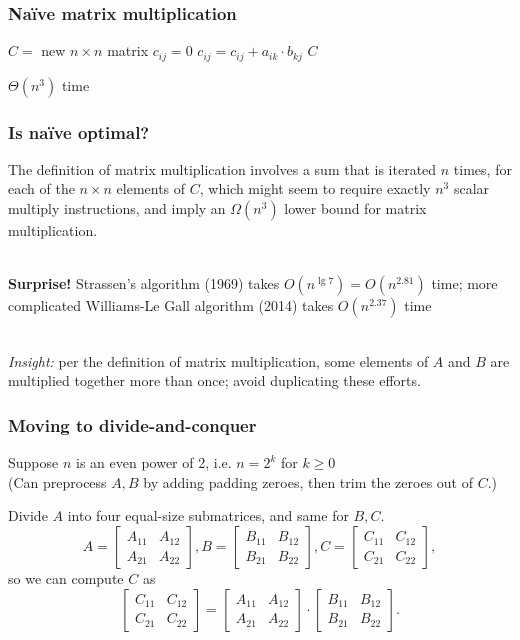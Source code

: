 \documentclass[10pt,aspectratio=169]{beamer}
\newcommand{\stanza}{ \\~\ }
\begin{document}
\begin{frame} \frametitle{Na\"ive matrix multiplication}
  {
  \begin{algorithmic}[1]
    \State $C = $ new $n \times n$ matrix
        \State $c_{ij} = 0$
          \State $c_{ij} = c_{ij} + a_{ik} \cdot b_{kj}$
        \EndFor
      \EndFor
    \EndFor
    \State \Return $C$
    \EndFunction
  \end{algorithmic}
  }
  $\Theta(n^3)$ time
\end{frame}

\begin{frame} \frametitle{Is na\"ive optimal?}
The definition of matrix multiplication involves a sum that is iterated $n$
times, for each of the $n \times n$ elements of $C$, which might seem to
require exactly $n^3$ scalar multiply instructions, and imply an
$\Omega(n^3)$ lower bound for matrix multiplication. \stanza

\textbf{Surprise!} Strassen's algorithm (1969) takes $O(n^{\lg 7})=O(n^{2.81})$ time;
 more complicated Williams-Le Gall algorithm (2014) takes $O(n^{2.37})$ time \stanza

\emph{Insight:} per the definition of matrix multiplication, some elements of
$A$ and $B$ are multiplied together more than once; avoid duplicating these
efforts.
\end{frame}

\begin{frame} \frametitle{Moving to divide-and-conquer}
  Suppose $n$ is an even power of 2, i.e. $n=2^k$ for $k \geq 0$ \\
  (Can preprocess $A, B$ by adding padding zeroes, then trim the zeroes
   out of $C.$)

  Divide $A$ into four equal-size submatrices, and same for $B, C$.
  \[ A = \begin{bmatrix} A_{11} & A_{12} \\ A_{21} & A_{22} \end{bmatrix},
     B = \begin{bmatrix} B_{11} & B_{12} \\ B_{21} & B_{22} \end{bmatrix},
     C = \begin{bmatrix} C_{11} & C_{12} \\ C_{21} & C_{22} \end{bmatrix},
   \]
  so we can compute $C$ as
  \[ \begin{bmatrix} C_{11} & C_{12} \\ C_{21} & C_{22} \end{bmatrix}
     =
     \begin{bmatrix} A_{11} & A_{12} \\ A_{21} & A_{22} \end{bmatrix}
     \cdot
     \begin{bmatrix} B_{11} & B_{12} \\ B_{21} & B_{22} \end{bmatrix} . \]
\end{frame}
\end{document}
